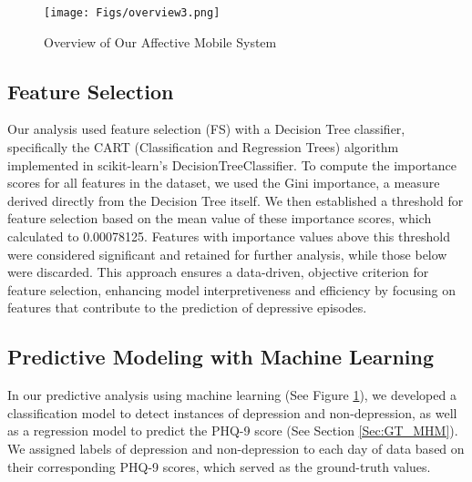 \begin{figure}
    \texttt{[image: Figs/overview3.png]}
    \caption{Overview of Our Affective Mobile System}
    \label{fig:FacePsyStudyFlow}
\end{figure}

\subsection{Feature Selection}
Our analysis used feature selection (FS) with a Decision Tree classifier, specifically the CART (Classification and Regression Trees) algorithm implemented in scikit-learn's DecisionTreeClassifier. To compute the importance scores for all features in the dataset, we used the Gini importance, a measure derived directly from the Decision Tree itself. We then established a threshold for feature selection based on the mean value of these importance scores, which calculated to 0.00078125. Features with importance values above this threshold were considered significant and retained for further analysis, while those below were discarded. This approach ensures a data-driven, objective criterion for feature selection, enhancing model interpretiveness and efficiency by focusing on features that contribute to the prediction of depressive episodes.

\subsection{Predictive Modeling with Machine Learning}
In our predictive analysis using machine learning (See Figure \ref{fig:FacePsyStudyFlow}), we developed a classification model to detect instances of depression and non-depression, as well as a regression model to predict the PHQ-9 score (See Section \ref{Sec:GT_MHM}). We assigned labels of depression and non-depression to each day of data based on their corresponding PHQ-9 scores, which served as the ground-truth values.

